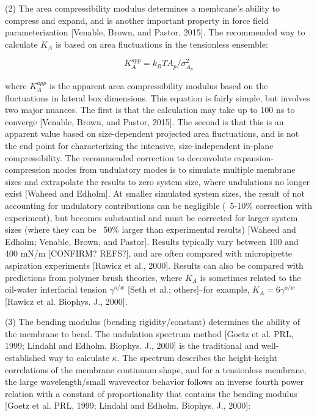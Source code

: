 \documentclass[9pt,bestpractices]{livecoms}
\begin{document}
(2) The area compressibility modulus determines a membrane's ability to compress and expand, and is another important property in force field parameterization [Venable, Brown, and Pastor, 2015].
The recommended way to calculate $K_A$ is based on area fluctuations in the tensionless ensemble:

\begin{equation}
	\label{e:partition}
	K_A^{app} = k_BTA_p/\sigma_{A_p}^2
\end{equation}

where $K_A^{app}$ is the apparent area compressibility modulus based on the fluctuations in lateral box dimensions.
This equation is fairly simple, but involves two major nuances.
The first is that the calculation may take up to 100 ns to converge [Venable, Brown, and Pastor, 2015].
The second is that this is an apparent value based on size-dependent projected area fluctuations, and is not the end point for characterizing the intensive, size-independent in-plane compressibility.
The recommended correction to deconvolute expansion-compression modes from undulatory modes is to simulate multiple membrane sizes and extrapolate the results to zero system size, where undulations no longer exist [Waheed and Edholm].
At smaller simulated system sizes, the result of not accounting for undulatory contributions can be negligible (~5-10\% correction with experiment), but becomes substantial and must be corrected for larger system sizes (where they can be ~50\% larger than experimental results) [Waheed and Edholm; Venable, Brown, and Pastor].
Results typically vary between 100 and 400 mN/m [CONFIRM? REFS?], and are often compared with micropipette aspiration experiments [Rawicz et al., 2000].
Results can also be compared with predictions from polymer brush theories, where $K_A$ is sometimes related to the oil-water interfacial tension $\gamma^{o/w}$ [Seth et al.; others]--for example, $K_A = 6 \gamma^{o/w}$ [Rawicz et al. Biophys. J., 2000].

(3) The bending modulus (bending rigidity/constant) determines the ability of the membrane to bend.
The undulation spectrum method [Goetz et al. PRL, 1999; Lindahl and Edholm. Biophys. J., 2000] is the traditional and well-established way to calculate $\kappa$.
The spectrum describes the height-height correlations of the membrane continuum shape, and for a tensionless membrane, the large wavelength/small wavevector behavior follows an inverse fourth power relation with a constant of proportionality that contains the bending modulus [Goetz et al. PRL, 1999; Lindahl and Edholm. Biophys. J., 2000]:
\end{document}
